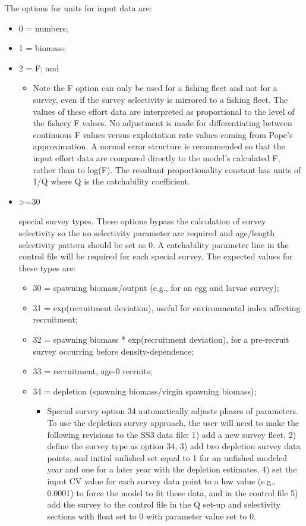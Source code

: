 \hypertarget{IndexUnits}{}
The options for units for input data are:	
	\begin{itemize}
		\item 0  = numbers;
		\item 1  = biomass; 
		\item 2  = F; and
		\begin{itemize}
			\item Note the F option can only be used for a fishing fleet and not for a survey, even if the survey selectivity is mirrored to a fishing fleet.  The values of these effort data are interpreted as proportional to the level of the fishery F values.  No adjustment is made for differentiating between continuous F values versus exploitation rate values coming from Pope's approximation.  A normal error structure is recommended so that the input effort data are compared directly to the model's calculated F, rather than to log(F).  The resultant proportionality constant has units of 1/Q where Q is the catchability coefficient. 	
		\end{itemize}
		\item \hypertarget{SpecialSurvey}{>=30} special survey types.  These options bypass the calculation of survey selectivity so the no selectivity parameter are required and age/length selectivity pattern should be set as 0. A catchability parameter line in the control file will be required for each special survey.  The expected values for these types are:
		\begin{itemize}
			\item 30 = spawning biomass/output (e.g., for an egg and larvae survey);
			\item 31 = exp(recruitment deviation), useful for environmental index affecting recruitment;
			\item 32 = spawning biomass * exp(recruitment deviation), for a pre-recruit survey occurring before density-dependence;
			\item 33 = recruitment, age-0 recruits;
			\item 34 = depletion (spawning biomass/virgin spawning biomass);
			\begin{itemize}
				\item Special survey option 34 automatically adjusts phases of parameters.  To use the depletion survey approach, the user will need to make the following revisions to the SS3 data file: 1) add a new survey fleet, 2) define the survey type as option 34, 3) add two depletion survey data points, and initial unfished set equal to 1 for an unfished modeled year and one for a later year with the depletion estimates, 4) set the input CV value for each survey data point to a low value (e.g., 0.0001) to force the model to fit these data, and in the control file 5) add the survey to the control file in the Q set-up and selectivity sections with float set to 0 with parameter value set to 0. 

\end{itemize}
\end{itemize}
\end{itemize}
